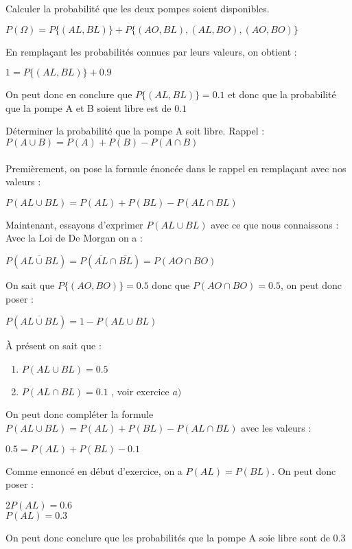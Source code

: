 \begin{exo}
\begin{subexo}{Calculer la probabilité que les deux pompes soient disponibles.}
    \begin{center}$P(\Omega) = P\{(AL,BL)\} + P\{(AO,BL),(AL,BO),(AO,BO)\}$\end{center}
    En remplaçant les probabilités connues par leurs valeurs, on obtient :
    \begin{center}$1 = P\{(AL,BL)\} + 0.9$\end{center}
    On peut donc en conclure que $P\{(AL,BL)\}  = 0.1$ et donc que la probabilité que la pompe A et B soient libre est de $0.1$
  \end{subexo}
\begin{subexo}{Déterminer la probabilité que la pompe A soit libre.}
  Rappel : $P(A\cup B) = P(A) + P(B) - P(A \cap B)$ \\ \\
  Premièrement, on pose la formule énoncée dans le rappel en remplaçant avec nos valeurs :
  \begin{center}$P(AL\cup BL) = P(AL) + P(BL) - P(AL \cap BL)$\end{center}
  Maintenant, essayons d'exprimer $P(AL\cup BL)$ avec ce que nous connaissons : \\
  Avec la Loi de De Morgan on a :
  \begin{center}$P(\overline{AL\cup BL}) = P(\overline{AL} \cap \overline{BL}) = P(AO \cap BO)$\end{center}
  On sait que $P\{(AO,BO)\}=0.5$ donc que $P(AO \cap BO)=0.5$, on peut donc poser :
  \begin{center}$P(\overline{AL\cup BL}) = 1 - P(AL \cup BL)$\end{center}
  À présent on sait que :
  \begin{enumerate}
    \item[ ] $P(AL \cup BL) = 0.5$
    \item[ ] $P(AL \cap BL) = 0.1$ , voir exercice $a)$
  \end{enumerate}
  On peut donc compléter la formule $P(AL\cup BL) = P(AL) + P(BL) - P(AL \cap BL)$ avec les valeurs :
  \begin{center}
    $0.5 = P(AL) + P(BL) - 0.1$
  \end{center}
  Comme ennoncé en début d'exercice, on a $P(AL) = P(BL)$. On peut donc poser :
  \begin{center}
    $2P(AL) = 0.6$ \\ $P(AL) = 0.3$
  \end{center}
  On peut donc conclure que les probabilités que la pompe A soie libre sont de 0.3
\end{subexo}

\end{exo}
